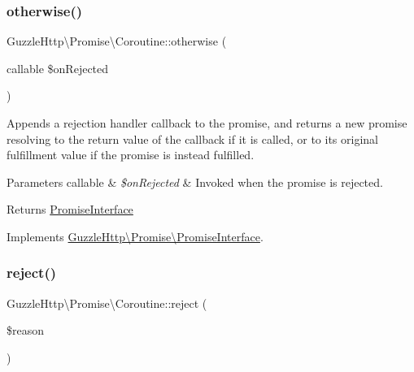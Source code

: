 \mbox{\label{classGuzzleHttp_1_1Promise_1_1Coroutine_adc412e8e82fa6fdee4649b8554452319}} 
\subsubsection{\texorpdfstring{otherwise()}{otherwise()}}
{\footnotesize\ttfamily Guzzle\+Http\textbackslash{}\+Promise\textbackslash{}\+Coroutine\+::otherwise (\begin{DoxyParamCaption}\item[{callable}]{\$on\+Rejected }\end{DoxyParamCaption})}

Appends a rejection handler callback to the promise, and returns a new promise resolving to the return value of the callback if it is called, or to its original fulfillment value if the promise is instead fulfilled.


\begin{DoxyParams}[1]{Parameters}
callable & {\em \$on\+Rejected} & Invoked when the promise is rejected.\\
\hline
\end{DoxyParams}
\begin{DoxyReturn}{Returns}
\hyperlink{interfaceGuzzleHttp_1_1Promise_1_1PromiseInterface}{Promise\+Interface} 
\end{DoxyReturn}


Implements \hyperlink{interfaceGuzzleHttp_1_1Promise_1_1PromiseInterface_a4a7334842850943b3dd2fdd8ec23943b}{Guzzle\+Http\textbackslash{}\+Promise\textbackslash{}\+Promise\+Interface}.

\mbox{\label{classGuzzleHttp_1_1Promise_1_1Coroutine_ad4894b8de07e0e279a475a309ca698e3}} 
\subsubsection{\texorpdfstring{reject()}{reject()}}
{\footnotesize\ttfamily Guzzle\+Http\textbackslash{}\+Promise\textbackslash{}\+Coroutine\+::reject (\begin{DoxyParamCaption}\item[{}]{\$reason }\end{DoxyParamCaption})}

